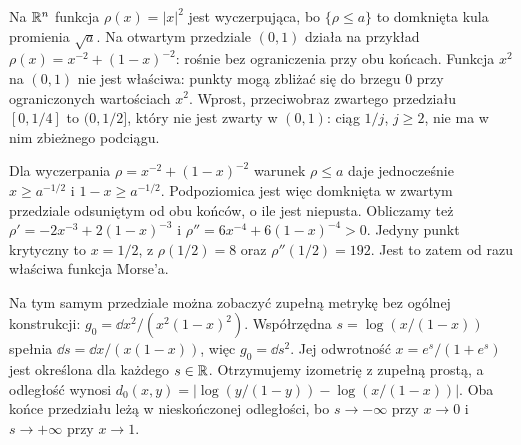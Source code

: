 \begin{przyklad}
Na $\mathbb{R}^n$ funkcja $\rho(x)=|x|^2$
jest wyczerpująca, bo
$\{\rho\leq a\}$ to domknięta
kula promienia $\sqrt a$.
Na otwartym przedziale $(0,1)$
działa na przykład
$\rho(x)=x^{-2}+(1-x)^{-2}$:
rośnie bez ograniczenia przy
obu końcach. Funkcja $x^2$
na $(0,1)$ nie jest właściwa:
punkty mogą zbliżać się do
brzegu $0$ przy ograniczonych
wartościach $x^2$.
Wprost, przeciwobraz zwartego przedziału $[0,1/4]$
to $(0,1/2]$, który nie jest zwarty w $(0,1)$:
ciąg $1/j$, $j\geq2$, nie ma w nim zbieżnego podciągu.

Dla wyczerpania $\rho=x^{-2}+(1-x)^{-2}$ warunek $\rho\leq a$
daje jednocześnie $x\geq a^{-1/2}$ i $1-x\geq a^{-1/2}$.
Podpoziomica jest więc domknięta w zwartym przedziale
odsuniętym od obu końców, o ile jest niepusta.
Obliczamy też
$\rho'=-2x^{-3}+2(1-x)^{-3}$ i
$\rho''=6x^{-4}+6(1-x)^{-4}>0$.
Jedyny punkt krytyczny to $x=1/2$, z
$\rho(1/2)=8$ oraz $\rho''(1/2)=192$.
Jest to zatem od razu właściwa funkcja Morse'a.

Na tym samym przedziale można zobaczyć zupełną metrykę
bez ogólnej konstrukcji:
$g_0=\dd x^2/(x^2(1-x)^2)$.
Współrzędna $s=\log(x/(1-x))$ spełnia
$\dd s=\dd x/(x(1-x))$, więc $g_0=\dd s^2$.
Jej odwrotność $x=e^s/(1+e^s)$ jest określona dla każdego
$s\in\mathbb{R}$. Otrzymujemy izometrię z zupełną prostą,
a odległość wynosi
$d_0(x,y)=|\log(y/(1-y))-\log(x/(1-x))|$.
Oba końce przedziału leżą w nieskończonej odległości,
bo $s\to-\infty$ przy $x\to0$ i $s\to+\infty$ przy $x\to1$.
\end{przyklad}

